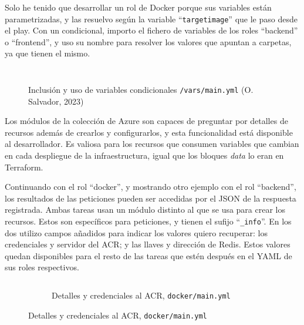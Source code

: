 \documentclass[11pt]{article}
\begin{document}
\begin{flushleft}
    Solo he tenido que desarrollar un rol de Docker porque sus variables están parametrizadas, y las resuelvo según la variable ``\texttt{targetimage}'' que le paso desde el play. Con un condicional, importo el fichero de variables de los roles ``backend'' o ``frontend'', y uso su nombre para resolver los valores que apuntan a carpetas, ya que tienen el mismo. 
    \linebreak

        \begin{figure}[htb]
			\centering
			\begin{subfigure}{.9\textwidth}
                \inputminted[fontsize=\scriptsize, firstline=1, lastline=3, linenos, frame=single, breaklines]{yaml}{../../ansible/ansible/roles/docker/main.yml}
                \inputminted[fontsize=\scriptsize, firstline=26, lastline=35, linenos, frame=single, breaklines]{yaml}{../../ansible/ansible/roles/docker/main.yml}
                \vspace{.2cm}
			\end{subfigure}
            \vspace{-.5cm}
            \caption{Inclusión y uso de variables condicionales \texttt{/vars/main.yml} (O. Salvador, 2023)}
		\end{figure} 

    \clearpage
    Los módulos de la colección de Azure son capaces de preguntar por detalles de recursos además de crearlos y configurarlos, y esta funcionalidad está disponible al desarrollador. Es valiosa para los recursos que consumen variables que cambian en cada despliegue de la infraestructura, igual que los bloques \textit{data} lo eran en Terraform. 
    \linebreak

    Continuando con el rol ``docker'', y mostrando otro ejemplo con el rol ``backend'', los resultados de las peticiones pueden ser accedidas por el JSON de la respuesta registrada. Ambas tareas usan un módulo distinto al que se usa para crear los recursos. Estos son específicos para peticiones, y tienen el sufijo ``\texttt{\_info}''. En los dos utilizo campos añadidos para indicar los valores quiero recuperar: los credenciales y servidor del ACR; y las llaves y dirección de Redis. Estos valores quedan disponibles para el resto de las tareas que estén después en el YAML de sus roles respectivos.
    \linebreak

        \begin{figure}[htb]
			\centering
			\begin{subfigure}{0.85\textwidth}
                \inputminted[fontsize=\scriptsize, firstline=16, lastline=24, linenos, frame=single, breaklines]{yaml}{../../ansible/ansible/roles/docker/main.yml}
                \caption{Detalles y credenciales al ACR, \texttt{docker/main.yml}}
			\end{subfigure}
            \linebreak
   

\end{figure}
\end{flushleft}
\end{document}
